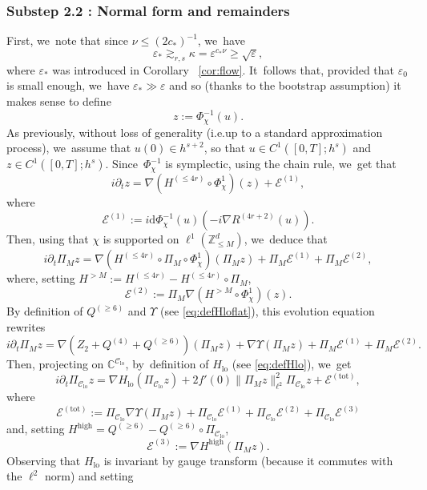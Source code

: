 \documentclass[10pt,a4paper]{amsart}
\providecommand{\ie}{i.e.}
\theoremstyle{plain}
\theoremstyle{definition}
\DeclareMathOperator{\lo}{lo}
\newcommand{\1}{\mathbf{1}}
\newcommand{\Clo}{\mathscr{C}_{\lo}}
\let\epsilon\varepsilon
\begin{document}
\subsubsection*{Substep 2.2 : Normal form and remainders}
First, we~note that since $\nu\leq(2c_\ast)^{-1}$, we~have
\begin{equation}
\label{eq:kappa_vs_eps1}
\varepsilon_\ast \gtrsim_{r,s} \kappa = \varepsilon^{c_\ast \nu} \geq \sqrt{\varepsilon},
\end{equation}
where $\epsilon_{\ast}$ was introduced in Corollary ~\ref{cor:flow}. It~follows that, provided that $\varepsilon_0$ is small enough, we~have $\varepsilon_\ast \gg \varepsilon$ and so (thanks to the bootstrap assumption) it makes sense to define
\[
z := \Phi_\chi^{-1}(u).
\]
As previously, without loss of generality (\ie up to a standard approximation process), we~assume that $u(0) \in h^{s+2}$, so that $u\in C^1([0,T];h^s)$ and $z \in C^1([0,T];h^s)$. Since~$\Phi_\chi^{-1}$ is symplectic, using the chain rule, we~get that
\[
i\partial_t z = \nabla (H^{(\leq 4r)} \circ \Phi_\chi^1)(z) + \mathcal{E}^{(1)},
\]
where
\[
\mathcal{E}^{(1)} := i\mathrm{d} \Phi_\chi^{-1}(u)(-i \nabla R^{(4r+2)}(u)).
\]
Then, using that $\chi$ is supported on $\ell^1(\mathbb{Z}^d_{\leq M})$, we~deduce that
\[
i\partial_t \Pi_M z = \nabla (H^{(\leq 4r)}\circ \Pi_M \circ \Phi_\chi^1)(\Pi_M z) + \Pi_M \mathcal{E}^{(1)} + \Pi_M \mathcal{E}^{(2)},
\]
where, setting $H^{>M} := H^{(\leq 4r)} - H^{(\leq 4r)} \circ \Pi_M$,
\[
\mathcal{E}^{(2)} := \Pi_M \nabla(H^{>M} \circ \Phi_\chi^1)(z).
\]
By definition of $Q^{(\geq 6)}$ and $\Upsilon$ (see \eqref{eq:defHloflat}), this evolution equation rewrites
\[
i\partial_t \Pi_M z = \nabla (Z_2 + Q^{(4)} + Q^{(\geq 6)})(\Pi_M z) + \nabla \Upsilon(\Pi_M z)+\Pi_M \mathcal{E}^{(1)} + \Pi_M \mathcal{E}^{(2)}.
\]
Then, projecting on $\mathbb{C}^{\Clo}$, by~definition of $ H_{\lo}$ (see \eqref{eq:defHlo}), we~get
\[
i\partial_t \Pi_{\Clo} z = \nabla H_{\lo}(\Pi_{\Clo} z) + 2f'(0) \| \Pi_{M} z \|_{\ell^2}^2 \Pi_{\Clo} z+ \mathcal{E}^{\mathrm{(tot)}},
\]
where
\begin{equation}
\label{eq:def_Etot}
\mathcal{E}^{\mathrm{(tot)}} := \Pi_{\Clo}\nabla \Upsilon(\Pi_M z)+\Pi_{\Clo} \mathcal{E}^{(1)} + \Pi_{\Clo}\mathcal{E}^{(2)} + \Pi_{\Clo}\mathcal{E}^{(3)}
\end{equation}
and, setting $H^{\mathrm{high}} = Q^{(\geq 6)} - Q^{(\geq 6)}\circ \Pi_{\Clo}$,
\[
\mathcal{E}^{(3)} := \nabla H^{\mathrm{high}}(\Pi_M z).
\]
Observing that $H_{\lo}$ is invariant by gauge transform (because it commutes with the $\ell^2$ norm) and setting
\end{document}
